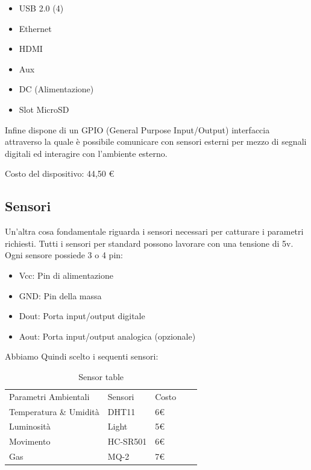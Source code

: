 \begin{itemize}
	\item USB 2.0 (4)
	\item Ethernet
	\item HDMI
	\item Aux
	\item DC (Alimentazione)
	\item Slot MicroSD
\end{itemize}
Infine dispone di un GPIO (General Purpose Input/Output) interfaccia attraverso la quale è possibile comunicare con sensori esterni per mezzo di segnali digitali ed interagire con l'ambiente esterno.

Costo del dispositivo: 44,50 \euro


\subsection{Sensori}

Un'altra cosa fondamentale riguarda i sensori necessari per catturare i parametri richiesti.
Tutti i sensori per standard possono lavorare con una tensione di 5v.
Ogni sensore possiede 3 o 4 pin:

\begin{itemize}
	\item Vcc: Pin di alimentazione
	\item GND: Pin della massa
	\item Dout: Porta input/output digitale
	\item Aout: Porta input/output analogica (opzionale)
\end{itemize}

 Abbiamo Quindi scelto i sequenti sensori:

\begin{table}[]
	
	\begin{tabular}{lllll}
		\cline{1-3}
		\multicolumn{1}{|l|}{Parametri Ambientali} & \multicolumn{1}{l|}{Sensori} & \multicolumn{1}{l|}{Costo} &  &  \\ \cline{1-3}
		Temperatura \& Umidità                     & DHT11                        & 6\euro                          &  &  \\
		Luminosità                                 & Light                        & 5\euro                          &  &  \\
		Movimento                                  & HC-SR501                     & 6\euro                          &  &  \\
		Gas                                  & MQ-2                   & 7\euro                         &  &
	\end{tabular}
	\centering
	\caption{Sensor table}
	\label{my-label}

\end{table}


